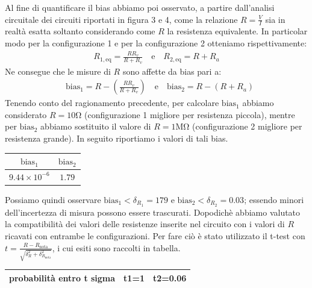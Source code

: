 \documentclass[a4paper]{article}
\begin{document}
Al fine di quantificare il bias abbiamo poi osservato, a partire dall'analisi circuitale dei circuiti riportati in figura 3 e 4, come la relazione $R=\frac{V}{I}$ sia in realtà esatta soltanto considerando come $R$ la resistenza equivalente. In particolar modo per la configurazione 1 e per la configurazione 2 otteniamo rispettivamente:
\begin{align*}
	R_{1,\text{eq}}=\frac{RR_v}{R+R_v} \quad \text{e} \quad R_{2,\text{eq}}=R+R_a
\end{align*}
Ne consegue che le misure di $R$ sono affette da bias pari a:
\begin{align*}
	 & \text{bias}_1= R-\left(\frac{RR_v}{R+R_v}\right)  \quad \text{e} \quad \text{bias}_2=R-(R+R_a)
\end{align*}
Tenendo conto del ragionamento precedente, per calcolare $\text{bias}_1$ abbiamo considerato $R = 10\si{\ohm}$ (configurazione 1 migliore per resistenza piccola), mentre per $\text{bias}_2$ abbiamo sostituito il valore di $R=1\si{\mega\ohm}$ (configurazione 2 migliore per resistenza grande).
In seguito riportiamo i valori di tali bias.

\begin{center}
\begin{tabular}{|c|c|}
\hline
$\text{bias}_1$ & $\text{bias}_2$ \\
\hline
$9.44\times 10^{-6}$ & $1.79$ \\
\hline
\end{tabular}
\end{center}

Possiamo quindi osservare $\text{bias}_1 < \delta_{R_1} = 179$ e $\text{bias}_2 < \delta_{R_2} = 0.03$; essendo minori dell'incertezza di misura possono essere trascurati.
Dopodichè abbiamo valutato la compatibilità dei valori delle resistenze inserite nel circuito con i valori di $R$ ricavati con entrambe le configurazioni. Per fare ciò è stato utilizzato il t-test con $t = \frac {R - R_{\text{nota}}}{\sqrt{\delta_{R}^2+\delta_{R_{\text{nota}}}^2}}$, i cui esiti sono raccolti in tabella.

\begin{center}
\begin{tabular}{|l|c|c|}
\hline
probabilità entro t sigma & t1=1 & t2=0.06 \\
\hline
\end{tabular}
\end{center}
\end{document}
